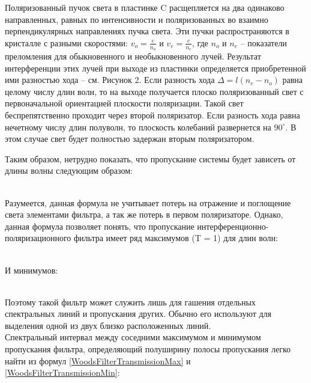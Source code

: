 Поляризованный пучок света в пластинке C расщепляется на два одинаково направленных, равных
по интенсивности и поляризованных во взаимно перпендикулярных направлениях пучка света.
Эти пучки распространяются в кристалле с разными скоростями: $ v_o = \frac{c}{n_o} $ и
$ v_e = \frac{c}{n_e} $, где $ n_o $ и $ n_e $ -- показатели преломления для обыкновенного
и необыкновенного лучей. Результат интерференции этих лучей при выходе из пластинки
определяется приобретенной ими разностью хода -- см. Рисунок 2. Если разность хода
$ \Delta = l\left( n_e - n_o \right) $ равна целому числу длин волн, то на выходе получается
плоско поляризованный свет с первоначальной ориентацией плоскости поляризации. Такой свет
беспрепятственно проходит через второй поляризатор. Если разность хода равна нечетному числу
длин полуволн, то плоскость колебаний развернется на $ 90^\circ $. В этом случае свет будет
полностью задержан вторым поляризатором. \\ [0.3cm]


\newpage

Таким образом, нетрудно показать, что пропускание системы будет зависеть от длины волны
следующим образом:

 \\

Разумеется, данная формула не учитывает потерь на отражение и поглощение света элементами
фильтра, а так же потерь в первом поляризаторе. Однако, данная формула позволяет понять,
что пропускание интерференционно-поляризационного фильтра имеет ряд максимумов (T = 1)
для длин волн:

 \\

И минимумов:

 \\

Поэтому такой фильтр может служить лишь для гашения отдельных спектральных линий и
пропускания других. Обычно его используют для выделения одной из двух близко расположенных
линий. \\

Спектральный интервал между соседними максимумом и минимумом пропускания фильтра,
определяющий полуширину полосы пропускания легко найти из формул
\ref{WoodsFilterTransmissionMax} и \ref{WoodsFilterTransmissionMin}:

